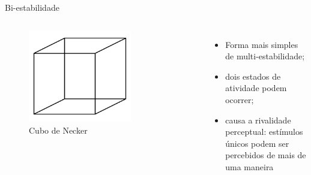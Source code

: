 \begin{frame}{Bi-estabilidade}
	\begin{columns}[t]
		\column{5cm}
			\begin{figure}[tb]
				\centering
				\caption{Cubo de Necker}
				\label{fig:cubonecker}
				\includegraphics[width=0.7\textwidth]{figs/cubo_necker}
			\end{figure}
		\column{5cm}
			\begin{itemize}
				\item Forma mais simples de multi-estabilidade;
				\item dois estados de atividade podem ocorrer;
				\item causa a rivalidade perceptual: estímulos únicos podem ser percebidos de mais de uma maneira
			\end{itemize}
	\end{columns}
\end{frame}


